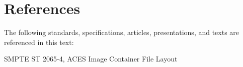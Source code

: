 \numberedformat
\chapter{References}
The following standards, specifications, articles, presentations, and texts are referenced in this text:

SMPTE ST 2065-4, ACES Image Container File Layout